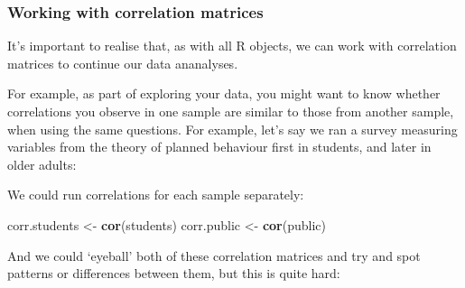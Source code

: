 \documentclass[]{article}
\newenvironment{Shaded}{\begin{snugshade}}{\end{snugshade}}
\newcommand{\KeywordTok}[1]{\textcolor[rgb]{0.13,0.29,0.53}{\textbf{#1}}}
\newcommand{\StringTok}[1]{\textcolor[rgb]{0.31,0.60,0.02}{#1}}
\newcommand{\OperatorTok}[1]{\textcolor[rgb]{0.81,0.36,0.00}{\textbf{#1}}}
\newcommand{\NormalTok}[1]{#1}
\theoremstyle{definition}
\theoremstyle{definition}
\theoremstyle{definition}
\theoremstyle{remark}
\begin{document}
\subsubsection*{Working with correlation
matrices}\label{working-with-correlation-matrices}

It's important to realise that, as with all R objects, we can work with
correlation matrices to continue our data ananalyses.

For example, as part of exploring your data, you might want to know
whether correlations you observe in one sample are similar to those from
another sample, when using the same questions. For example, let's say we
ran a survey measuring variables from the theory of planned behaviour
first in students, and later in older adults:

We could run correlations for each sample separately:

\begin{Shaded}
\begin{Highlighting}[]
\NormalTok{corr.students <-}\StringTok{ }\KeywordTok{cor}\NormalTok{(students)}
\NormalTok{corr.public <-}\StringTok{ }\KeywordTok{cor}\NormalTok{(public)}
\end{Highlighting}
\end{Shaded}

And we could `eyeball' both of these correlation matrices and try and
spot patterns or differences between them, but this is quite hard:

\begin{Shaded}
\end{Shaded}
\end{document}
